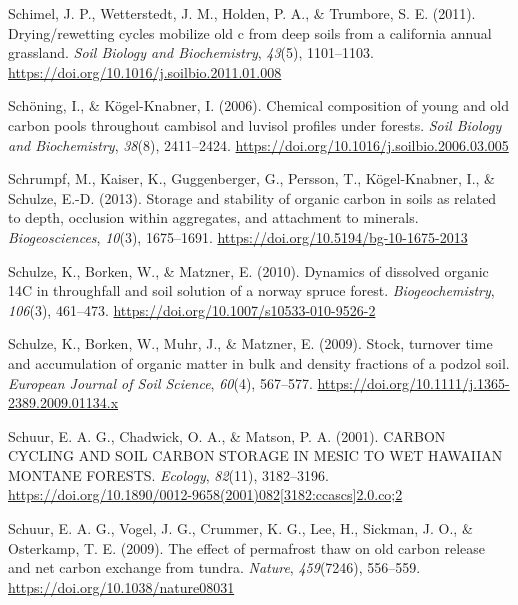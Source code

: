\documentclass[]{article}
\begin{document}
\leavevmode\hypertarget{ref-Schimel_2011}{}%
Schimel, J. P., Wetterstedt, J. M., Holden, P. A., \& Trumbore, S. E.
(2011). Drying/rewetting cycles mobilize old c from deep soils from a
california annual grassland. \emph{Soil Biology and Biochemistry},
\emph{43}(5), 1101--1103.
\url{https://doi.org/10.1016/j.soilbio.2011.01.008}

\leavevmode\hypertarget{ref-Sch_ning_2006}{}%
Schöning, I., \& Kögel-Knabner, I. (2006). Chemical composition of young
and old carbon pools throughout cambisol and luvisol profiles under
forests. \emph{Soil Biology and Biochemistry}, \emph{38}(8), 2411--2424.
\url{https://doi.org/10.1016/j.soilbio.2006.03.005}

\leavevmode\hypertarget{ref-Schrumpf_2013}{}%
Schrumpf, M., Kaiser, K., Guggenberger, G., Persson, T., Kögel-Knabner,
I., \& Schulze, E.-D. (2013). Storage and stability of organic carbon in
soils as related to depth, occlusion within aggregates, and attachment
to minerals. \emph{Biogeosciences}, \emph{10}(3), 1675--1691.
\url{https://doi.org/10.5194/bg-10-1675-2013}

\leavevmode\hypertarget{ref-Schulze_2010}{}%
Schulze, K., Borken, W., \& Matzner, E. (2010). Dynamics of dissolved
organic 14C in throughfall and soil solution of a norway spruce forest.
\emph{Biogeochemistry}, \emph{106}(3), 461--473.
\url{https://doi.org/10.1007/s10533-010-9526-2}

\leavevmode\hypertarget{ref-Schulze_2009}{}%
Schulze, K., Borken, W., Muhr, J., \& Matzner, E. (2009). Stock,
turnover time and accumulation of organic matter in bulk and density
fractions of a podzol soil. \emph{European Journal of Soil Science},
\emph{60}(4), 567--577.
\url{https://doi.org/10.1111/j.1365-2389.2009.01134.x}

\leavevmode\hypertarget{ref-Schuur_2001}{}%
Schuur, E. A. G., Chadwick, O. A., \& Matson, P. A. (2001). CARBON
CYCLING AND SOIL CARBON STORAGE IN MESIC TO WET HAWAIIAN MONTANE
FORESTS. \emph{Ecology}, \emph{82}(11), 3182--3196.
\href{https://doi.org/10.1890/0012-9658(2001)082\%5B3182:ccascs\%5D2.0.co;2}{https://doi.org/10.1890/0012-9658(2001)082{[}3182:ccascs{]}2.0.co;2}

\leavevmode\hypertarget{ref-Schuur_2009}{}%
Schuur, E. A. G., Vogel, J. G., Crummer, K. G., Lee, H., Sickman, J. O.,
\& Osterkamp, T. E. (2009). The effect of permafrost thaw on old carbon
release and net carbon exchange from tundra. \emph{Nature},
\emph{459}(7246), 556--559. \url{https://doi.org/10.1038/nature08031}
\end{document}
